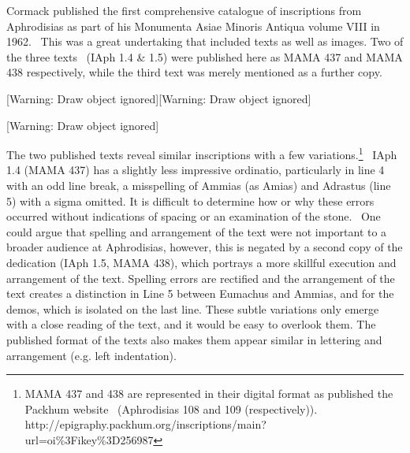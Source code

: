 \documentclass[amsthm,ebook]{saparticle}
\begin{document}
\bigskip

Cormack published the first comprehensive catalogue of inscriptions from Aphrodisias as part of his Monumenta Asiae
Minoris Antiqua volume VIII in 1962. \ This was a great undertaking that included texts as well as images. Two of the
three texts \ (IAph 1.4 \& 1.5) were published here as MAMA 437 and MAMA 438 respectively, while the third text was
merely mentioned as a further copy. 


\bigskip


\bigskip


\bigskip


\bigskip

[Warning: Draw object ignored][Warning: Draw object ignored]


\bigskip


\bigskip


\bigskip


\bigskip


\bigskip


\bigskip


\bigskip


\bigskip


\bigskip


\bigskip


\bigskip


\bigskip


\bigskip


\bigskip


\bigskip

[Warning: Draw object ignored]


\bigskip

The two published texts reveal similar inscriptions with a few variations.\footnote{ MAMA 437 and 438 are represented in
their digital format as published the Packhum website \ (Aphrodisias 108 and 109 (respectively)).
http://epigraphy.packhum.org/inscriptions/main?url=oi\%3Fikey\%3D256987} \ IAph 1.4 (MAMA 437) has a slightly less
impressive ordinatio, particularly in line 4 with an odd line break, a misspelling of Ammias (as Amias) and Adrastus
(line 5) with a sigma omitted. It is difficult to determine how or why these errors occurred without indications of
spacing or an examination of the stone. \ One could argue that spelling and arrangement of the text were not important
to a broader audience at Aphrodisias, however, this is negated by a second copy of the dedication (IAph 1.5, MAMA 438),
which portrays a more skillful execution and arrangement of the text. Spelling errors are rectified and the arrangement
of the text creates a distinction in Line 5 between Eumachus and Ammias, and for the demos, which is isolated on the
last line. These subtle variations only emerge with a close reading of the text, and it would be easy to overlook them.
The published format of the texts also makes them appear similar in lettering and arrangement (e.g. left indentation).
\ 
\end{document}
